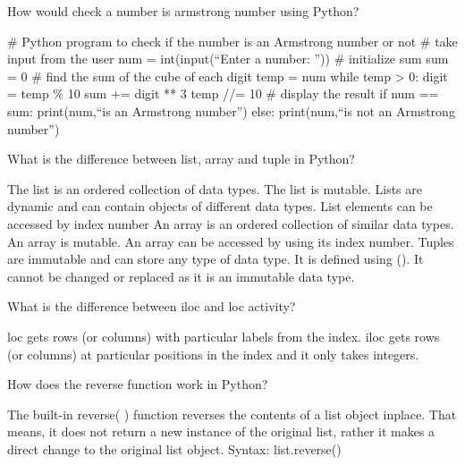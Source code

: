	\begin{qanda}
		\begin{question}
How would check a number is armstrong number using Python?
		\end{question}
		\begin{answer}
\# Python program to check if the number is an Armstrong number or not \# take input from the user num = int(input(``Enter a number: '')) \# initialize sum sum = 0 \# find the sum of the cube of each digit temp = num while temp > 0: digit = temp \% 10 sum += digit ** 3 temp //= 10 \# display the result if num == sum: print(num,``is an Armstrong number'') else: print(num,``is not an Armstrong number'')
		\end{answer}
	\end{qanda}

	\begin{qanda}
		\begin{question}
What is the difference between list, array and tuple in Python?
		\end{question}
		\begin{answer}
The list is an ordered collection of data types.  The list is mutable. Lists are dynamic and can contain objects of different data types.  List elements can be accessed by index number An array is an ordered collection of similar data types.  An array is mutable.  An array can be accessed by using its index number.  Tuples are immutable and can store any type of data type. It is defined using ().  It cannot be changed or replaced as it is an immutable data type.
		\end{answer}
	\end{qanda}

	\begin{qanda}
		\begin{question}
What is the difference between iloc and loc activity?
		\end{question}
		\begin{answer}
loc gets rows (or columns) with particular labels from the index. iloc gets rows (or columns) at particular positions in the index and it only takes integers.
		\end{answer}
	\end{qanda}

	\begin{qanda}
		\begin{question}
How does the reverse function work in Python?
		\end{question}
		\begin{answer}
The built-in reverse( ) function reverses the contents of a list object inplace. That means, it does not return a new instance of the original list, rather it makes a direct change to the original list object. Syntax: list.reverse()
		\end{answer}
	\end{qanda}

